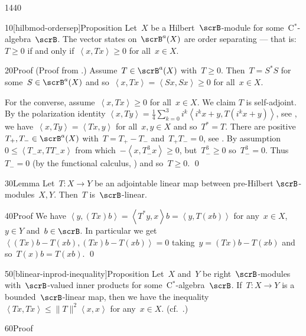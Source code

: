 \begin{parsec}{1440}%
\begin{point}{10}[hilbmod-ordersep]{Proposition}%
Let~$X$ be a Hilbert~$\scrB$-module for some~C$^*$-algebra~$\scrB$.
The vector states on~$\scrB^a(X)$ are order separating ---
that is: $T \geq 0$ if and only if~$\left<x,Tx\right> \geq 0$
for all~$x \in X$.
\begin{point}{20}{Proof}%
(Proof from \cite[lem.~4.1]{lance}.)
Assume~$T \in \scrB^a(X)$ with~$T \geq 0$.
Then~$T = S^*S$ for some~$S \in \scrB^a(X)$
    and so~$\left<x, Tx\right> = \left<Sx,Sx\right> \geq 0$
    for all~$x \in X$.

For the converse, assume~$\left<x, Tx\right> \geq 0$
    for all~$x \in X$.
We claim $T$ is self-adjoint.
By the polarization identity
$\left<x, Ty\right>
    = \frac{1}{4} \sum^3_{k=0} i^k \left< i^k x+y, T(i^k x+y)\right>$,
    see ,
    we have~$\left<x,Ty \right> = \left<Tx, y\right>$ for all~$x,y \in X$
    and so~$T^*=T$.
There are positive~$T_+,T_- \in \scrB^a(X)$
with~$T = T_+ - T_-$ and~$T_+T_- = 0$, see .
By assumption~$0 \leq \left<T_-x,TT_-x\right>$
    from which~$-\left<x,T_-^3x\right> \geq 0$,
    but~$T_-^3 \geq 0$ so~$T_-^3 = 0$.
    Thus~$T_- = 0$ (by the functional calculus, )
    and so~$T \geq 0$. \qed
\end{point}
\end{point}
\begin{point}{30}{Lemma}%
Let~$T\colon X \to Y$
    be an adjointable linear map
    between pre-Hilbert $\scrB$-modules~$X,Y$.
    Then~$T$ is~$\scrB$-linear. \cite[\S2]{paschke}
\begin{point}{40}{Proof}%
We have
    $\left<y, (Tx)b\right>
    =\left<T^*y, x\right>b
    =\left<y, T(xb)\right>$
for any~$x \in X$, $y \in Y$ and~$b \in \scrB$.
In particular we
get~$\left<(Tx)b-T(xb), (Tx)b-T(xb)\right>=0$
taking~$y = (Tx)b-T(xb)$
    and so~$T(x)b=T(xb)$. \qed
\end{point}
\end{point}
\begin{point}{50}[blinear-inprod-inequality]{Proposition}%
Let~$X$ and~$Y$ be right~$\scrB$-modules with~$\scrB$-valued
    inner products for some~C$^*$-algebra~$\scrB$.
If~$T \colon X \to Y$ is a bounded~$\scrB$-linear map,
    then we have the
        inequality~$\left<Tx,Tx\right>\leq \|T\|^2 \left<x,x\right>$
    for any~$x \in X$.  (cf.~\cite[rem.~2.9]{paschke}.)
\begin{point}{60}{Proof}

\end{point}
\end{point}
\end{parsec}
